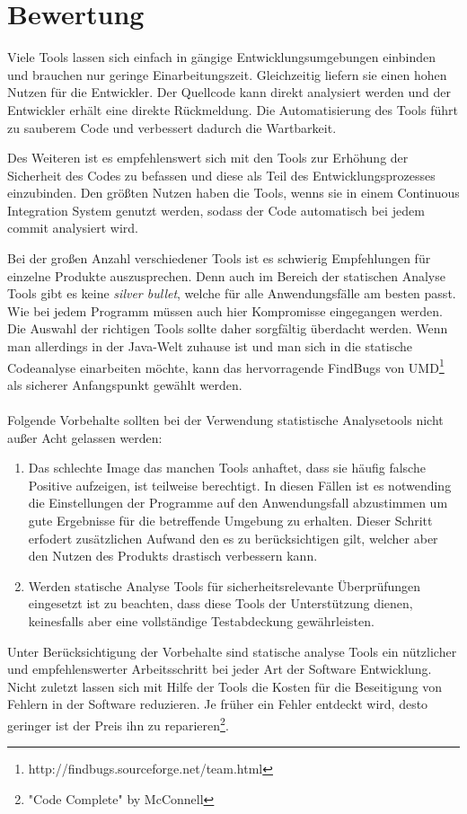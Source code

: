 \section{Bewertung}
Viele Tools lassen sich einfach in gängige Entwicklungsumgebungen einbinden und brauchen nur geringe Einarbeitungszeit. Gleichzeitig liefern sie einen hohen Nutzen für die Entwickler. Der Quellcode kann direkt analysiert werden und der Entwickler erhält eine direkte Rückmeldung. Die Automatisierung des Tools führt zu sauberem Code und verbessert dadurch die Wartbarkeit.

Des Weiteren ist es empfehlenswert sich mit den Tools zur Erhöhung der Sicherheit des Codes zu befassen und diese als Teil des Entwicklungsprozesses einzubinden. Den größten Nutzen haben die Tools, wenns sie in einem Continuous Integration System genutzt werden, sodass der Code automatisch bei jedem commit analysiert wird.

Bei der großen Anzahl verschiedener Tools ist es schwierig Empfehlungen für einzelne Produkte auszusprechen. Denn auch im Bereich der statischen Analyse Tools gibt es keine \emph{silver bullet}, welche für alle Anwendungsfälle am besten passt. Wie bei jedem Programm müssen auch hier Kompromisse eingegangen werden. Die Auswahl der richtigen Tools sollte daher sorgfältig überdacht werden. Wenn man allerdings in der Java-Welt zuhause ist und man sich in die statische Codeanalyse einarbeiten möchte, kann das hervorragende FindBugs von UMD\footnote{http://findbugs.sourceforge.net/team.html} als sicherer Anfangspunkt gewählt werden.
\\\\
Folgende Vorbehalte sollten bei der Verwendung statistische Analysetools nicht außer Acht gelassen werden:
\begin{enumerate}
  \item Das schlechte Image das manchen Tools anhaftet, dass sie häufig falsche Positive aufzeigen, ist teilweise berechtigt. In diesen Fällen ist es notwending die Einstellungen der Programme auf den Anwendungsfall abzustimmen um gute Ergebnisse für die betreffende Umgebung zu erhalten. Dieser Schritt erfodert zusätzlichen Aufwand den es zu berücksichtigen gilt, welcher aber den Nutzen des Produkts drastisch verbessern kann.
  \item Werden statische Analyse Tools für sicherheitsrelevante Überprüfungen eingesetzt ist zu beachten, dass diese Tools der Unterstützung dienen, keinesfalls aber eine vollständige Testabdeckung gewährleisten.
\end{enumerate}

Unter Berücksichtigung der Vorbehalte sind statische analyse Tools ein nützlicher und empfehlenswerter Arbeitsschritt bei jeder  Art der Software Entwicklung. Nicht zuletzt lassen sich mit Hilfe der Tools die Kosten für die Beseitigung von Fehlern in der Software reduzieren. Je früher ein Fehler entdeckt wird, desto geringer ist der Preis ihn zu reparieren\footnote{"Code Complete" by McConnell}.
